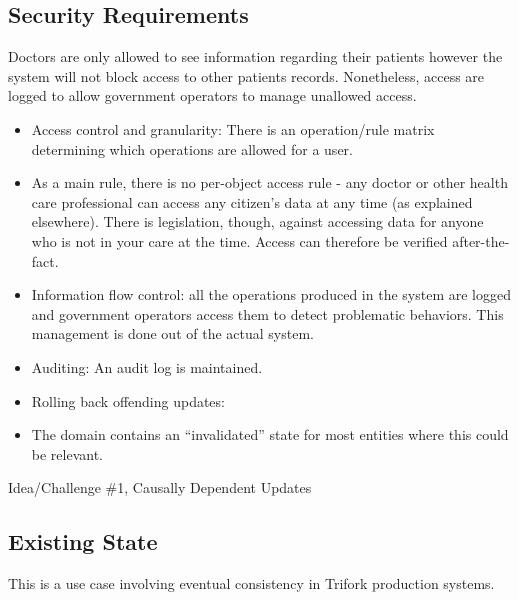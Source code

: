 \documentclass[11pt,a4paper]{report}
\begin{document}
\subsection{Security Requirements}
Doctors are only allowed to see information regarding their patients however the system will not block access to other patients records. Nonetheless, access are logged to allow government operators to manage unallowed access.
\begin{itemize}
\item Access control and granularity: There is an operation/rule matrix determining which operations are allowed for a user.
\item As a main rule, there is no per-object access rule - any doctor or other health care professional can access any citizen's data at any time (as explained elsewhere). There is legislation, though, against accessing data for anyone who is not in your care at the time. Access can therefore be verified after-the-fact.
\item Information flow control: all the operations produced in the system are logged and government operators access them to detect problematic behaviors. This management is done out of the actual system. 
\item Auditing: An audit log is maintained.
\item Rolling back offending updates:
\item The domain contains an ``invalidated'' state for most entities where this could be relevant.
\end{itemize}
Idea/Challenge \#1, Causally Dependent Updates

\subsection{Existing State}
This is a use case involving eventual consistency in Trifork production systems.
\end{document}
